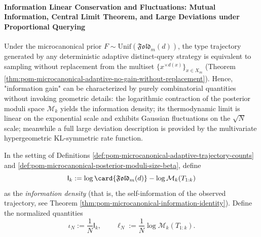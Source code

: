 \paragraph{Information Linear Conservation and Fluctuations: Mutual Information, Central Limit Theorem, and Large Deviations under Proportional Querying}
Under the microcanonical prior \(F\sim\mathrm{Unif}(\mathfrak{Fold}_m(d))\),
the type trajectory generated by any deterministic adaptive distinct-query strategy is equivalent to sampling without replacement from the multiset \(\{x^{\times d(x)}\}_{x\in X_m}\) (Theorem \ref{thm:pom-microcanonical-adaptive-no-gain-without-replacement}).
Hence, "information gain" can be characterized by purely combinatorial quantities without invoking geometric details: the logarithmic contraction of the posterior moduli space \(\mathcal{M}_k\) yields the information density;
its thermodynamic limit is linear on the exponential scale and exhibits Gaussian fluctuations on the \(\sqrt N\) scale; meanwhile a full large deviation description is provided by the multivariate hypergeometric KL-symmetric rate function.

\begin{definition}\label{def:pom-microcanonical-information-density}
In the setting of Definitions \ref{def:pom-microcanonical-adaptive-trajectory-counts} and \ref{def:pom-microcanonical-posterior-moduli-size-beta},
define
\[
\mathsf{I}_k:=\log\card{\mathfrak{Fold}_m(d)}-\log \mathcal{M}_k(T_{1:k})
\]
as the \emph{information density} (that is, the self-information of the observed trajectory, see Theorem \ref{thm:pom-microcanonical-information-identity}).
Define the normalized quantities
\[
\iota_N:=\frac{1}{N}\mathsf{I}_k,
\qquad
\ell_N:=\frac{1}{N}\log \mathcal{M}_k(T_{1:k}).
\]
\end{definition}

